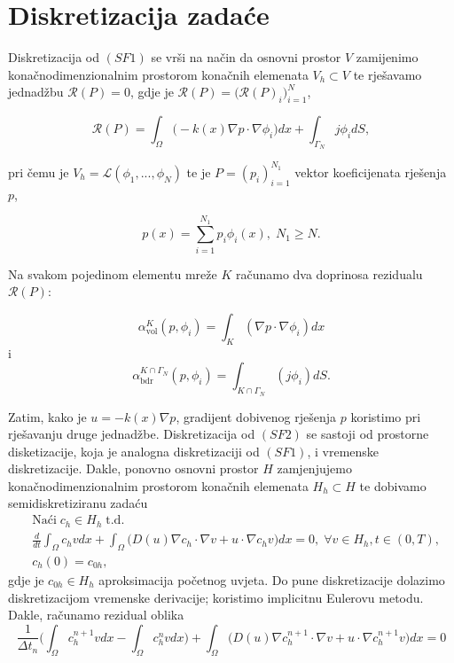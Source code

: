 \documentclass[a4paper,12pt]{article}
\begin{document}
\section{Diskretizacija zadaće}

Diskretizacija od $(SF1)$ se vrši na način da osnovni prostor $V$ zamijenimo konačnodimenzionalnim prostorom konačnih elemenata $V_h \subset V$ te rješavamo jednadžbu $\mathcal{R}(P) = 0$, gdje je $\mathcal{R}(P) = \Big( \mathcal{R}(P)_i \Big)_{i=1}^N$,

\begin{equation*}
\mathcal{R}(P) = \int_{\Omega} \Big( -k(x) \nabla p \cdot \nabla \phi_i \Big) dx + \int_{\Gamma_N} j \phi_i dS,
\end{equation*}

pri čemu je $V_h = \mathcal{L}(\phi_1, ..., \phi_N)$ te je $P = (p_i)_{i=1}^{N_1}$ vektor koeficijenata rješenja $p$,

\begin{equation*}
p(x) = \sum_{i=1}^{N_1} p_i \phi_i(x), \; N_1 \geq N.
\end{equation*}

Na svakom pojedinom elementu mreže $K$ računamo dva doprinosa rezidualu $\mathcal{R}(P)$:

\begin{equation*}
\alpha_{\text{vol}}^{K}(p, \phi_i) = \int_K ( \nabla p \cdot \nabla \phi_i )dx
\end{equation*}
i
\begin{equation*}
\alpha_{\text{bdr}}^{K \cap \Gamma_N}(p, \phi_i) = \int_{K \cap \Gamma_N} ( j \phi_i )dS.
\end{equation*}

Zatim, kako je $u = -k(x) \nabla p$, gradijent dobivenog rješenja $p$ koristimo pri rješavanju druge jednadžbe. Diskretizacija od $(SF2)$ se sastoji od prostorne disketizacije, koja je analogna diskretizaciji od $(SF1)$, i vremenske diskretizacije. Dakle, ponovno osnovni prostor $H$ zamjenjujemo konačnodimenzionalnim prostorom konačnih elemenata $H_h \subset H$ te dobivamo semidiskretiziranu zadaću
\begin{align*}
&\text{Naći} \; c_h \in H_h \; \text{t.d.} \\
&\frac{d}{dt} \int_{\Omega} c_h v dx + \int_{\Omega} \Big( D(u) \nabla c_h \cdot \nabla v + u \cdot \nabla c_h v \Big) dx = 0, \; \forall v \in H_h, t \in (0,T), \\
&c_h(0) = c_{0h},
\end{align*}
gdje je $c_{0h} \in H_h$ aproksimacija početnog uvjeta. Do pune diskretizacije dolazimo diskretizacijom vremenske derivacije; koristimo implicitnu Eulerovu metodu. Dakle, računamo rezidual oblika
\begin{equation*}
\frac{1}{\Delta t_n} \Big( \int_{\Omega} c_h^{n+1} v dx - \int_{\Omega} c_h^{n} v dx \Big) + \int_{\Omega} \Big( D(u) \nabla c_h^{n+1} \cdot \nabla v + u \cdot \nabla c_h^{n+1} v \Big) dx = 0
\end{equation*}
\end{document}

